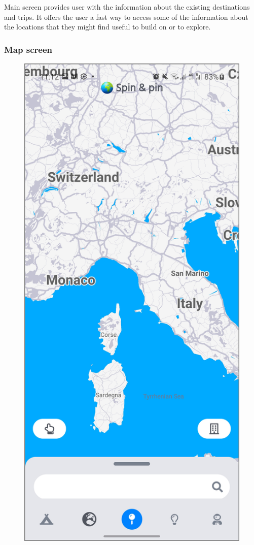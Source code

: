 Main screen provides user with the information about the existing destinations and trips. It offers the user a fast way to access some of the information about the locations that they might find useful to build on or to explore.
\newpage
\subsubsection{Map screen}
\begin{figure}[!htb]
\centering
\begin{minipage}{.48\textwidth}
\centering
\includegraphics[width=.9\textwidth]{../Images/UI/MapSearchLight.jpg}

\end{minipage}
\end{figure}
